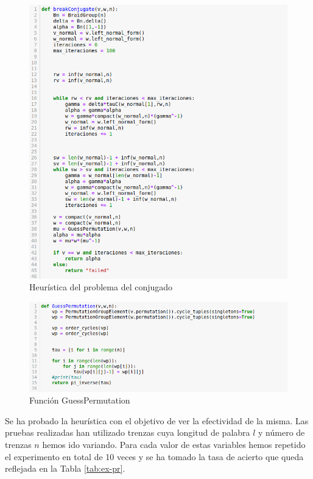 \documentclass[12pt]{book}
\theoremstyle{definition}
\begin{document}
\begin{figure}[]
\centering
\includegraphics[scale=0.5]{imgs/breakConjugate.png} 
\caption{Heurística del problema del conjugado}
\label{img:alg_a}
\end{figure}

\begin{figure}[]
\centering
\includegraphics[scale=0.5]{imgs/GuessPermutation.png} 
\caption{Función GuessPermutation}
\label{img:guess_per}
\end{figure}

Se ha probado la heurística con el objetivo de ver la efectividad de la misma. Las pruebas realizadas han utilizado trenzas cuya longitud de palabra $l$ y número de trenzas $n$ hemos ido variando. Para cada valor de estas variables hemos repetido el experimento en total de 10 veces y se ha tomado la tasa de acierto que queda reflejada en la Tabla \ref{tab:ex-pr}.
\end{document}
